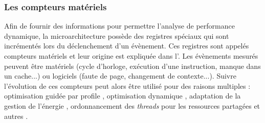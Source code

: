 

    \subsubsection{Les compteurs matériels}
 
        Afin de fournir des informations pour permettre l'analyse de performance dynamique, la microarchitecture possède des registres spéciaux qui sont incrémentés lors du déclenchement d'un évènement. Ces registres sont appelés compteurs matériels et leur origine est expliquée dans l'. Les évènements mesurés peuvent être matériels (cycle d'horloge, exécution d'une instruction, manque dans un cache...) ou logiciels (faute de page, changement de contexte...). Suivre l'évolution de ces compteurs peut alors être utilisé pour des raisons multiples \cite{Moseley2011} : optimisation guidée par profile \cite{Cavazos2006}, optimisation dynamique \cite{Dai2005}, adaptation de la gestion de l'énergie \cite{Isci2005}, ordonnancement des \textit{threads} pour les ressources partagées \cite{Moseley2006} et autres \cite{Shye2005, Shye2008}.
        
